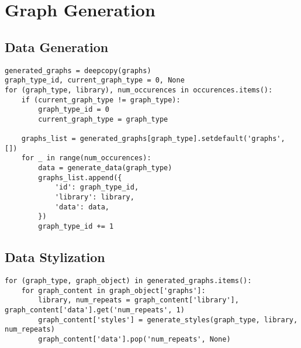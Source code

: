 \chapter[Graph Generation]{Graph Generation}
\label{AppendixA}

\lstset{
basicstyle=\small\ttfamily,
columns=flexible,
breaklines=true
}

\section{Data Generation}
\begin{lstlisting}
generated_graphs = deepcopy(graphs)
graph_type_id, current_graph_type = 0, None
for (graph_type, library), num_occurences in occurences.items():
    if (current_graph_type != graph_type):
        graph_type_id = 0
        current_graph_type = graph_type
        
    graphs_list = generated_graphs[graph_type].setdefault('graphs', [])
    for _ in range(num_occurences):
        data = generate_data(graph_type)
        graphs_list.append({
            'id': graph_type_id,
            'library': library,
            'data': data,
        })
        graph_type_id += 1
\end{lstlisting}

\section{Data Stylization}
\begin{lstlisting}
for (graph_type, graph_object) in generated_graphs.items():
    for graph_content in graph_object['graphs']:
        library, num_repeats = graph_content['library'], graph_content['data'].get('num_repeats', 1)
        graph_content['styles'] = generate_styles(graph_type, library, num_repeats)
        graph_content['data'].pop('num_repeats', None)
\end{lstlisting}


